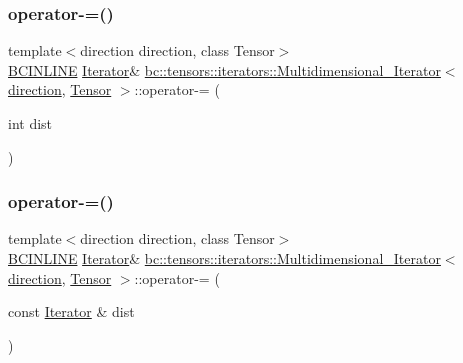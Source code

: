 \subsubsection{\texorpdfstring{operator-\/=()}{operator-=()}\hspace{0.1cm}{\footnotesize\ttfamily [1/2]}}
{\footnotesize\ttfamily template$<$direction direction, class Tensor$>$ \\
\hyperlink{common_8h_a6699e8b0449da5c0fafb878e59c1d4b1}{B\+C\+I\+N\+L\+I\+NE} \hyperlink{structbc_1_1tensors_1_1iterators_1_1Multidimensional__Iterator_a12d78eb95b3b0fbee7c824f0a79c1513}{Iterator}\& \hyperlink{structbc_1_1tensors_1_1iterators_1_1Multidimensional__Iterator}{bc\+::tensors\+::iterators\+::\+Multidimensional\+\_\+\+Iterator}$<$ \hyperlink{namespacebc_1_1tensors_1_1iterators_ae76efe63fb9cb4985d5e4e6af0ebf296}{direction}, \hyperlink{namespacebc_a659391e47ab612be3ba6c18cf9c89159}{Tensor} $>$\+::operator-\/= (\begin{DoxyParamCaption}\item[{int}]{dist }\end{DoxyParamCaption})\hspace{0.3cm}{\ttfamily [inline]}}

\mbox{\label{structbc_1_1tensors_1_1iterators_1_1Multidimensional__Iterator_ae04f5c8ef0d5d7235391565b59ad8946}} 
\subsubsection{\texorpdfstring{operator-\/=()}{operator-=()}\hspace{0.1cm}{\footnotesize\ttfamily [2/2]}}
{\footnotesize\ttfamily template$<$direction direction, class Tensor$>$ \\
\hyperlink{common_8h_a6699e8b0449da5c0fafb878e59c1d4b1}{B\+C\+I\+N\+L\+I\+NE} \hyperlink{structbc_1_1tensors_1_1iterators_1_1Multidimensional__Iterator_a12d78eb95b3b0fbee7c824f0a79c1513}{Iterator}\& \hyperlink{structbc_1_1tensors_1_1iterators_1_1Multidimensional__Iterator}{bc\+::tensors\+::iterators\+::\+Multidimensional\+\_\+\+Iterator}$<$ \hyperlink{namespacebc_1_1tensors_1_1iterators_ae76efe63fb9cb4985d5e4e6af0ebf296}{direction}, \hyperlink{namespacebc_a659391e47ab612be3ba6c18cf9c89159}{Tensor} $>$\+::operator-\/= (\begin{DoxyParamCaption}\item[{const \hyperlink{structbc_1_1tensors_1_1iterators_1_1Multidimensional__Iterator_a12d78eb95b3b0fbee7c824f0a79c1513}{Iterator} \&}]{dist }\end{DoxyParamCaption})\hspace{0.3cm}{\ttfamily [inline]}}

